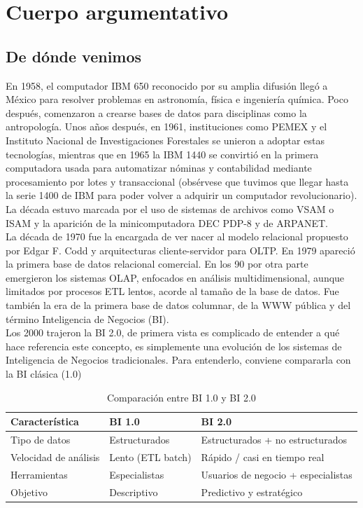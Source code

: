 \documentclass[12pt]{article}
\numberwithin{equation}{section}
\numberwithin{figure}{section}
\numberwithin{table}{section}
\begin{document}
\section{Cuerpo argumentativo}
\subsection*{De dónde venimos}
En 1958, el computador IBM 650 reconocido por su amplia difusión llegó a México para resolver problemas en astronomía, física e ingeniería química. Poco después, comenzaron a crearse bases de datos para disciplinas como la antropología.
Unos años después, en 1961, instituciones como PEMEX y el Instituto Nacional de Investigaciones Forestales se unieron a adoptar estas tecnologías, mientras que en 1965 la IBM 1440 se convirtió en la primera computadora usada para automatizar nóminas y contabilidad mediante procesamiento por lotes y transaccional (obsérvese que tuvimos que llegar hasta la serie 1400 de IBM para poder volver a adquirir un computador revolucionario). La década estuvo marcada por el uso de sistemas de archivos como VSAM o ISAM y la aparición de la minicomputadora DEC PDP-8 y de ARPANET. \\

La década de 1970 fue la encargada de ver nacer al modelo relacional propuesto por Edgar F. Codd y arquitecturas cliente-servidor para OLTP. En 1979 apareció la primera base de datos relacional comercial. En los 90 por otra parte emergieron los sistemas OLAP, enfocados en análisis multidimensional, aunque limitados por procesos ETL lentos, acorde al tamaño de la base de datos. Fue también la era de la primera base de datos columnar, de la WWW pública y del término Inteligencia de Negocios (BI).\\
Los 2000 trajeron la BI 2.0, de primera vista es complicado de entender a qué hace referencia este concepto, es simplemente una evolución de los sistemas de Inteligencia de Negocios tradicionales. Para entenderlo, conviene compararla con la BI clásica (1.0)

\begin{table}[h!]
\centering
\begin{tabular}{|l|l|l|}
\hline
\textbf{Característica} & \textbf{BI 1.0} & \textbf{BI 2.0} \\ \hline
Tipo de datos & Estructurados & Estructurados + no estructurados \\ \hline
Velocidad de análisis & Lento (ETL batch) & Rápido / casi en tiempo real \\ \hline
Herramientas & Especialistas & Usuarios de negocio + especialistas \\ \hline
Objetivo & Descriptivo & Predictivo y estratégico \\ \hline
\end{tabular}
\caption{Comparación entre BI 1.0 y BI 2.0}
\label{tab:bi_comparison}
\end{table}
\end{document}
